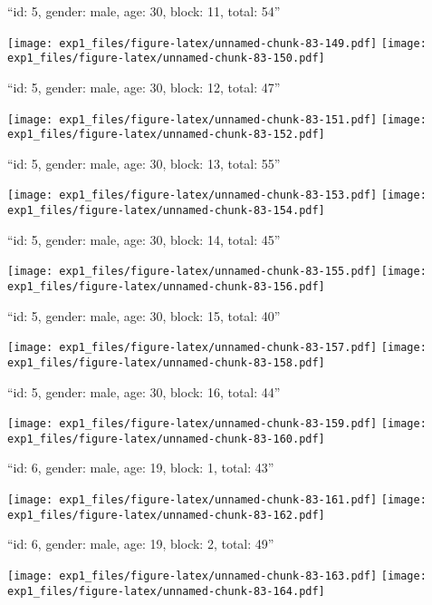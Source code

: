 \documentclass[11pt,,]{article}
\begin{document}
\newpage
[1] 

``id: 5, gender: male, age: 30, block: 11, total: 54''

\texttt{[image: exp1\_files/figure-latex/unnamed-chunk-83-149.pdf]}
\texttt{[image: exp1\_files/figure-latex/unnamed-chunk-83-150.pdf]}

\newpage
[1] 

``id: 5, gender: male, age: 30, block: 12, total: 47''

\texttt{[image: exp1\_files/figure-latex/unnamed-chunk-83-151.pdf]}
\texttt{[image: exp1\_files/figure-latex/unnamed-chunk-83-152.pdf]}

\newpage
[1] 

``id: 5, gender: male, age: 30, block: 13, total: 55''

\texttt{[image: exp1\_files/figure-latex/unnamed-chunk-83-153.pdf]}
\texttt{[image: exp1\_files/figure-latex/unnamed-chunk-83-154.pdf]}

\newpage
[1] 

``id: 5, gender: male, age: 30, block: 14, total: 45''

\texttt{[image: exp1\_files/figure-latex/unnamed-chunk-83-155.pdf]}
\texttt{[image: exp1\_files/figure-latex/unnamed-chunk-83-156.pdf]}

\newpage
[1] 

``id: 5, gender: male, age: 30, block: 15, total: 40''

\texttt{[image: exp1\_files/figure-latex/unnamed-chunk-83-157.pdf]}
\texttt{[image: exp1\_files/figure-latex/unnamed-chunk-83-158.pdf]}

\newpage
[1] 

``id: 5, gender: male, age: 30, block: 16, total: 44''

\texttt{[image: exp1\_files/figure-latex/unnamed-chunk-83-159.pdf]}
\texttt{[image: exp1\_files/figure-latex/unnamed-chunk-83-160.pdf]}

\newpage
[1] 

``id: 6, gender: male, age: 19, block: 1, total: 43''

\texttt{[image: exp1\_files/figure-latex/unnamed-chunk-83-161.pdf]}
\texttt{[image: exp1\_files/figure-latex/unnamed-chunk-83-162.pdf]}

\newpage
[1] 

``id: 6, gender: male, age: 19, block: 2, total: 49''

\texttt{[image: exp1\_files/figure-latex/unnamed-chunk-83-163.pdf]}
\texttt{[image: exp1\_files/figure-latex/unnamed-chunk-83-164.pdf]}
\end{document}
